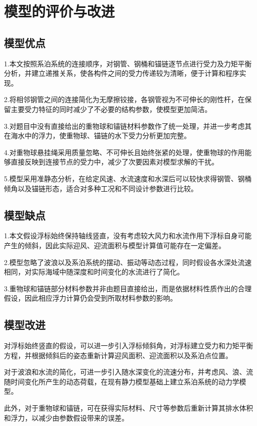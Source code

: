 \section{模型的评价与改进}

\subsection{模型优点}

1.本文按照系泊系统的连接顺序，对钢管、钢桶和锚链逐节点进行受力及力矩平衡分析，并建立递推关系，使各构件之间的受力传递较为清晰，便于计算和程序实现。

2.将相邻钢管之间的连接简化为无摩擦铰接，各钢管视为不可伸长的刚性杆，在保留主要受力特征的同时减少了不必要的结构参数，使模型更加简洁。

3.对题目中没有直接给出的重物球和锚链材料参数作了统一处理，并进一步考虑其在海水中的浮力，使重物球、锚链的水下受力分析更加完整。

4.对重物球悬挂绳采用质量忽略、不可伸长且始终张紧的处理，使重物球的作用能够直接反映到连接节点的受力中，减少了次要因素对模型求解的干扰。

5.模型采用准静态分析，在给定风速、水流速度和水深后可以较快求得钢管、钢桶倾角以及锚链形态，适合对多种工况和不同设计参数进行比较。

\subsection{模型缺点}

1.本文假设浮标始终保持轴线竖直，没有考虑较大风力和水流作用下浮标自身可能产生的倾斜，因此实际迎风、迎流面积与模型计算值可能存在一定偏差。

2.模型忽略了波浪以及系泊系统的摆动、振动等动态过程，同时假设各水深处流速相同，对实际海域中随深度和时间变化的水流进行了简化。

3.重物球和锚链部分材料参数并非由题目直接给出，而是依据材料性质作出的合理假设，因此相应浮力计算仍会受到所取材料参数的影响。

\subsection{模型改进}

对浮标始终竖直的假设，可以进一步引入浮标倾斜角，对浮标建立受力和力矩平衡方程，并根据倾斜后的姿态重新计算迎风面积、迎流面积以及系泊点位置。

对于波浪和水流的简化，可进一步引入随水深变化的流速分布，并考虑风、浪、流随时间变化所产生的动态荷载，在现有静力模型基础上建立系泊系统的动力学模型。

此外，对于重物球和锚链，可在获得实际材料、尺寸等参数后重新计算其排水体积和浮力，以减少由参数假设带来的误差。
